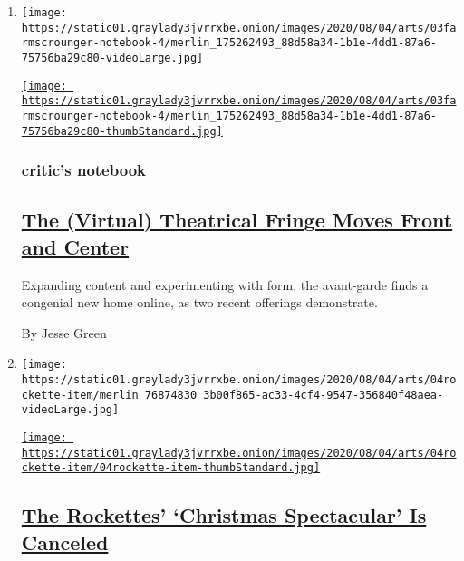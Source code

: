 \begin{enumerate}
\def\labelenumi{\arabic{enumi}.}
\item
  \texttt{[image: https://static01.graylady3jvrrxbe.onion/images/2020/08/04/arts/03farmscrounger-notebook-4/merlin\_175262493\_88d58a34-1b1e-4dd1-87a6-75756ba29c80-videoLarge.jpg]}

  \href{/2020/08/03/theater/virtual-theater.html}{\texttt{[image: https://static01.graylady3jvrrxbe.onion/images/2020/08/04/arts/03farmscrounger-notebook-4/merlin\_175262493\_88d58a34-1b1e-4dd1-87a6-75756ba29c80-thumbStandard.jpg]}}

  \hypertarget{critics-notebook}{%
  \subsubsection{critic's notebook}\label{critics-notebook}}

  \hypertarget{the-virtual-theatrical-fringe-moves-front-and-center}{%
  \subsection{\texorpdfstring{\href{/2020/08/03/theater/virtual-theater.html}{The
  (Virtual) Theatrical Fringe Moves Front and
  Center}}{The (Virtual) Theatrical Fringe Moves Front and Center}}\label{the-virtual-theatrical-fringe-moves-front-and-center}}

  Expanding content and experimenting with form, the avant-garde finds a
  congenial new home online, as two recent offerings demonstrate.

  By Jesse Green
\item
  \texttt{[image: https://static01.graylady3jvrrxbe.onion/images/2020/08/04/arts/04rockette-item/merlin\_76874830\_3b00f865-ac33-4cf4-9547-356840f48aea-videoLarge.jpg]}

  \href{/2020/08/04/theater/radio-city-rockettes-christmas-canceled.html}{\texttt{[image: https://static01.graylady3jvrrxbe.onion/images/2020/08/04/arts/04rockette-item/04rockette-item-thumbStandard.jpg]}}

  \hypertarget{the-rockettes-christmas-spectacular-is-canceled}{%
  \subsection{\texorpdfstring{\href{/2020/08/04/theater/radio-city-rockettes-christmas-canceled.html}{The
  Rockettes' `Christmas Spectacular' Is
  Canceled}}{The Rockettes' `Christmas Spectacular' Is Canceled}}\label{the-rockettes-christmas-spectacular-is-canceled}}


\end{enumerate}
